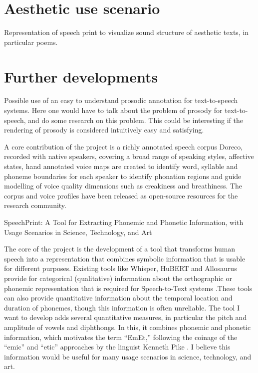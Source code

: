 

\section{Aesthetic use scenario}

Representation of speech print to visualize sound structure of aesthetic texts, in particular poems. 

\section{Further developments}

Possible use of an easy to understand prosodic annotation for text-to-speech systems. Here one would have to talk about the problem of prosody for text-to-speech, and do some research on this problem. This could be interesting if the rendering of prosody is considered intuitively easy and satisfying. 





A core contribution of the project is a richly annotated speech corpus Doreco, recorded with native speakers, covering a broad range of speaking styles, affective states, hand annotated voice maps are created to identify word, syllable and phoneme boundaries for each speaker to identify phonation regions and guide modelling of voice quality dimensions such as creakiness and breathiness. The corpus and voice profiles have been released as open-source resources for the research community.


SpeechPrint: A Tool for Extracting Phonemic and Phonetic Information, with Usage Scenarios in Science, Technology, and Art

The core of the project is the development of a tool that transforms human speech into a representation that combines symbolic information that is usable for different purposes. Existing tools like Whisper, HuBERT and Allosaurus provide for categorical (qualitative) information about the orthographic or phonemic representation that is required for Speech-to-Text systems \cite{radford2023whisper,hsu2021hubert,li2020allosaurus}.These tools can also provide quantitative information about the temporal location and duration of phonemes, though this information is often unreliable. The tool I want to develop adds several quantitative measures, in particular the pitch and amplitude of vowels and diphthongs. In this, it combines phonemic and phonetic information, which motivates the term “EmEt,” following the coinage of the “emic” and “etic” approaches by the linguist Kenneth Pike \cite{pike1967language}. I believe this information would be useful for many usage scenarios in science, technology, and art.

